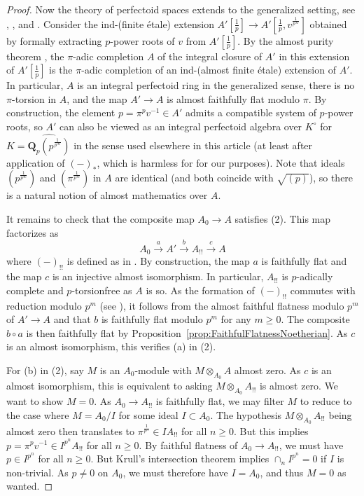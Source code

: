 \documentclass[10pt,reqno]{amsart}
\begin{document}
\begin{proof}
Now the theory of perfectoid spaces extends to the generalized setting, see \cite[\S 6]{ScholzeWeinsteinBerkeley}, \cite[\S 16]{GabberRameroFART}, and \cite[\S 3]{KedlayaLiu}. Consider the ind-(finite \'etale) extension $A'[\frac{1}{p}] \to A'[\frac{1}{p}, v^{\frac{1}{p^\infty}}]$ obtained by formally extracting $p$-power roots of $v$ from $A'[\frac{1}{p}]$. By the almost purity theorem  \cite[Theorem 7.9 (iii)]{ScholzePerfectoidSpaces}, the $\pi$-adic completion $A$ of the integral closure of $A'$ in this extension of $A'[\frac{1}{p}]$ is the $\pi$-adic completion of an ind-(almost finite \'etale) extension of $A'$. In particular, $A$ is an integral perfectoid ring in the generalized sense, there is no $\pi$-torsion in $A$, and the map $A' \to A$ is almost faithfully flat modulo $\pi$. By construction, the element $p = \pi^p v^{-1} \in A'$ admits a compatible system of $p$-power roots, so $A'$ can also be viewed as an integral perfectoid algebra over $K^\circ$ for $K = \widehat{\mathbf{Q}_p(p^{\frac{1}{p^\infty}})}$ in the sense used elsewhere in this article (at least after application of $(-)_*$, which is harmless for for our purposes). Note that ideals $(p^{\frac{1}{p^\infty}})$ and $(\pi^{\frac{1}{p^\infty}})$ in $A$ are identical (and both coincide with $\sqrt{(p)}$), so there is a natural notion of almost mathematics over $A$.

It remains to check that the composite map $A_0 \to A$ satisfies (2). This map factorizes as
\[ A_0 \xrightarrow{a} A' \xrightarrow{b} A_{!!} \xrightarrow{c} A\]
where $(-)_{!!}$ is defined as in \cite[Definition 2.2.23]{GabberRamero}. By construction, the map $a$ is faithfully flat and the map $c$ is an injective almost isomorphism. In particular, $A_{!!}$ is $p$-adically complete and $p$-torsionfree as $A$ is so. As the formation of $(-)_{!!}$ commutes with reduction modulo $p^m$ (see \cite[Remark 2.2.28 (ii)]{GabberRamero}), it follows from the almost faithful flatness modulo $p^m$ of $A' \to A$ and \cite[Remark 3.1.3 (ii)]{GabberRamero} that $b$ is faithfully flat modulo $p^m$ for any $m \geq 0$. The composite $b \circ a$ is then faithfully flat by Proposition~\ref{prop:FaithfulFlatnessNoetherian}. As $c$ is an almost isomorphism, this verifies (a) in (2).

For (b) in (2), say $M$ is an $A_0$-module with $M \otimes_{A_0} A$ almost zero. As $c$ is an almost isomorphism, this is equivalent to asking $M \otimes_{A_0} A_{!!}$ is almost zero. We want to show $M = 0$. As $A_0 \to A_{!!}$ is faithfully flat, we may filter $M$ to reduce to the case where $M = A_0/I$ for some ideal $I \subset A_0$. The hypothesis $M \otimes_{A_0} A_{!!}$ being almost zero then translates to $\pi^{\frac{1}{p^n}} \in IA_{!!}$ for all $n \geq 0$. But this implies $p = \pi^p v^{-1} \in I^{p^n} A_{!!}$ for all $n \geq 0$. By faithful flatness of $A_0 \to A_{!!}$, we must have $p \in I^{p^n}$ for all $n \geq 0$. But Krull's intersection theorem implies $\cap_n I^{p^n} = 0$ if $I$ is non-trivial. As $p \neq 0$ on $A_0$, we must therefore have $I = A_0$, and thus $M = 0$ as wanted.
\end{proof}
\end{document}

